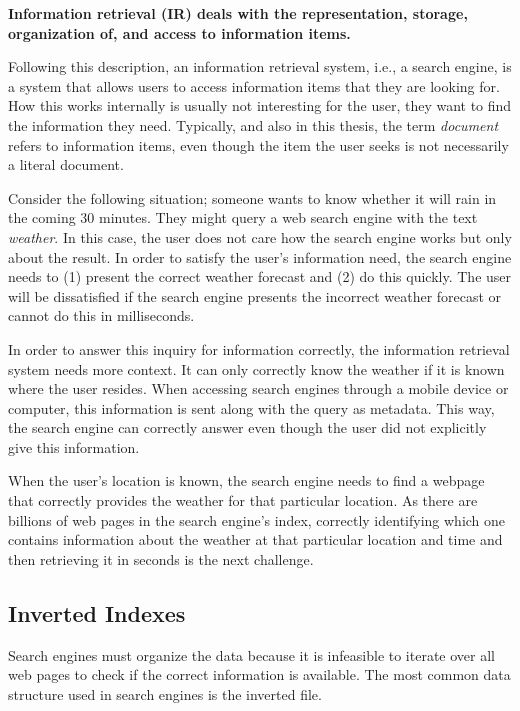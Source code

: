 \medskip
\textbf{Information retrieval (IR) deals with the representation, storage, organization of, and access to information items.}

\medskip
Following this description, an information retrieval system, i.e., a search engine, is a system that allows users to access information items that they are looking for. How this works internally is usually not interesting for the user, they want to find the information they need. Typically, and also in this thesis, the term \emph{document} refers to information items, even though the item the user seeks is not necessarily a literal document. 

Consider the following situation; someone wants to know whether it will rain in the coming 30 minutes. They might query a web search engine with the text \emph{weather}. In this case, the user does not care how the search engine works but only about the result. In order to satisfy the user's information need, the search engine needs to (1) present the correct weather forecast and (2) do this quickly. The user will be dissatisfied if the search engine presents the incorrect weather forecast or cannot do this in milliseconds.

In order to answer this inquiry for information correctly, the information retrieval system needs more context. It can only correctly know the weather if it is known where the user resides. When accessing search engines through a mobile device or computer, this information is sent along with the query as metadata. This way, the search engine can correctly answer even though the user did not explicitly give this information. 

When the user's location is known, the search engine needs to find a webpage that correctly provides the weather for that particular location. As there are billions of web pages in the search engine's index, correctly identifying which one contains information about the weather at that particular location and time and then retrieving it in seconds is the next challenge.

\subsection{Inverted Indexes}
Search engines must organize the data because it is infeasible to iterate over all web pages to check if the correct information is available. The most common data structure used in search engines is the inverted file.


